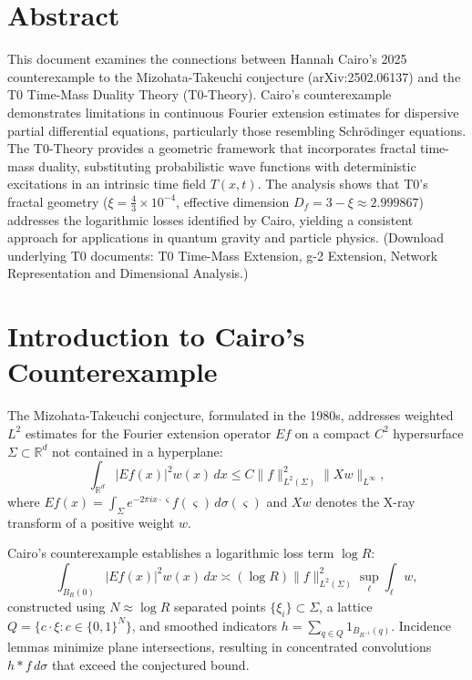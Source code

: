 \section*{Abstract}
		This document examines the connections between Hannah Cairo's 2025 counterexample to the Mizohata-Takeuchi conjecture (arXiv:2502.06137) and the T0 Time-Mass Duality Theory (T0-Theory). Cairo's counterexample demonstrates limitations in continuous Fourier extension estimates for dispersive partial differential equations, particularly those resembling Schrödinger equations. The T0-Theory provides a geometric framework that incorporates fractal time-mass duality, substituting probabilistic wave functions with deterministic excitations in an intrinsic time field $T(x,t)$. The analysis shows that T0's fractal geometry ($\xi = \frac{4}{3} \times 10^{-4}$, effective dimension $D_f = 3 - \xi \approx 2.999867$) addresses the logarithmic losses identified by Cairo, yielding a consistent approach for applications in quantum gravity and particle physics. (Download underlying T0 documents: T0 Time-Mass Extension, g-2 Extension, Network Representation and Dimensional Analysis.)

	
	
	
	\section{Introduction to Cairo's Counterexample}
	
	The Mizohata-Takeuchi conjecture, formulated in the 1980s, addresses weighted $L^2$ estimates for the Fourier extension operator $Ef$ on a compact $C^2$ hypersurface $\Sigma \subset \mathbb{R}^d$ not contained in a hyperplane:
	\begin{equation}
		\int_{\mathbb{R}^d} |Ef(x)|^2 w(x) \, dx \leq C \|f\|_{L^2(\Sigma)}^2 \|Xw\|_{L^\infty},
	\end{equation}
	where $Ef(x) = \int_\Sigma e^{-2\pi i x \cdot \varsigma} f(\varsigma) \, d\sigma(\varsigma)$ and $Xw$ denotes the X-ray transform of a positive weight $w$.
	
	Cairo's counterexample establishes a logarithmic loss term $\log R$:
	\begin{equation}
		\int_{B_R(0)} |Ef(x)|^2 w(x) \, dx \asymp (\log R) \|f\|_{L^2(\Sigma)}^2 \sup_\ell \int_\ell w,
	\end{equation}
	constructed using $N \approx \log R$ separated points $\{\xi_i\} \subset \Sigma$, a lattice $Q = \{ c \cdot \xi : c \in \{0,1\}^N \}$, and smoothed indicators $h = \sum_{q \in Q} 1_{B_{R^{-1}}(q)}$. Incidence lemmas minimize plane intersections, resulting in concentrated convolutions $h \ast f \, d\sigma$ that exceed the conjectured bound.
	
